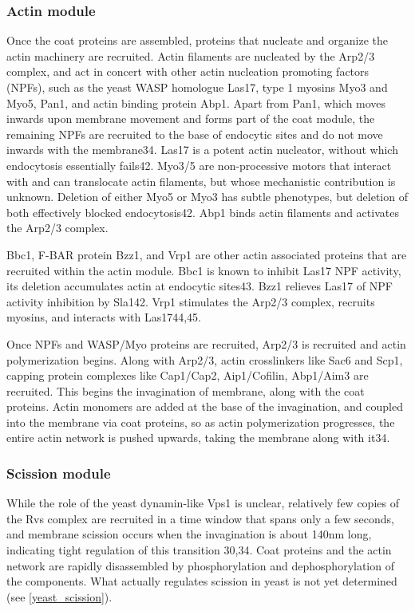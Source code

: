 			\subsubsection{Actin module}
			Once the coat proteins are assembled, proteins that nucleate and organize the actin machinery are recruited. Actin filaments are nucleated by the Arp2/3 complex, and act in concert with other actin nucleation promoting factors (NPFs), such as the yeast WASP homologue Las17, type 1 myosins Myo3 and Myo5, Pan1, and actin binding protein Abp1. Apart from Pan1, which moves inwards upon membrane movement and forms part of the coat module, the remaining NPFs are recruited to the base of endocytic sites and do not move inwards with the membrane34. Las17 is a potent actin nucleator, without which endocytosis essentially fails42. Myo3/5 are non-processive motors that interact with and can translocate actin filaments, but whose mechanistic contribution is unknown. Deletion of either Myo5 or Myo3 has subtle phenotypes, but deletion of both effectively blocked endocytosis42. Abp1 binds actin filaments and activates the Arp2/3 complex. 

			\vspace{5mm}
			Bbc1, F-BAR protein Bzz1, and Vrp1 are other actin associated proteins that are recruited within the actin module. Bbc1 is known to inhibit Las17 NPF activity, its deletion accumulates actin at endocytic sites43. Bzz1 relieves Las17 of NPF activity inhibition by Sla142. Vrp1 stimulates the Arp2/3 complex, recruits myosins, and interacts with Las1744,45. 


			\vspace{5mm}
			Once NPFs and WASP/Myo proteins are recruited, Arp2/3 is recruited and actin polymerization begins. Along with Arp2/3, actin crosslinkers like Sac6 and Scp1, capping protein complexes like Cap1/Cap2, Aip1/Cofilin, Abp1/Aim3 are recruited. This begins the invagination of membrane, along with the coat proteins. Actin monomers are added at the base of the invagination, and coupled into the membrane via coat proteins, so as actin polymerization progresses, the entire actin network is pushed upwards, taking the membrane along with it34.

			\subsubsection{Scission module}
		While the role of the yeast dynamin-like Vps1 is unclear, relatively few copies of the Rvs complex are recruited in a time window that spans only a few seconds, and membrane scission occurs when the invagination is about 140nm long, indicating tight regulation of this transition 30,34. Coat proteins and the actin network are rapidly disassembled by phosphorylation and dephosphorylation of the components.  What actually regulates scission in yeast is not yet determined (see \ref{yeast_scission}).


